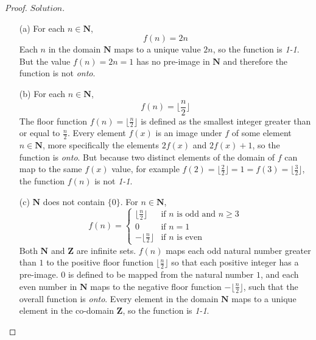\documentclass{article}
\begin{document}
\begin{proof}
$Solution.$
\begin{enumerate}
    \item[(a)] For each $n \in \mathbf{N}$,
    \begin{equation*}
        f(n) = 2n
    \end{equation*}
    Each $n$ in the domain $\mathbf{N}$ maps to a unique value $2n$, so the function is {\it 1-1}. But the value $f(n) = 2n = 1$ has no pre-image in $\mathbf{N}$ and therefore the function is not {\it onto}. 
    
    \item[(b)] For each $n \in \mathbf{N}$,
    \begin{equation*}
        f(n) = \lfloor \frac{n}{2} \rfloor
    \end{equation*} 
    The floor function $f(n) = \lfloor \frac{n}{2} \rfloor$ is defined as the smallest integer greater than or equal to $\frac{n}{2}$. Every element $f(x)$ is an image under $f$ of some element $n \in \mathbf{N}$, more specifically the elements $2f(x)$ and $2f(x) + 1$, so the function is {\it onto}. But because two distinct elements of the domain of $f$ can map to the same $f(x)$ value, for example $f(2) = \lfloor \frac{2}{2} \rfloor = 1 = f(3) = \lfloor \frac{3}{2} \rfloor$, the function $f(n)$ is not {\it 1-1}.

    \item[(c)] $\mathbf{N}$ does not contain $\{0\}$. For $n \in \mathbf{N}$,
    \begin{equation*}
        f(n) = 
        \begin{cases}
        \lfloor \frac{n}{2} \rfloor & \text{if $n$ is odd and $n \geq 3$}\\
        0 & \text{if } n = 1 \\
        -\lfloor \frac{n}{2} \rfloor & \text{if $n$ is even}
        \end{cases}
    \end{equation*}
    Both $\mathbf{N}$ and $\mathbf{Z}$ are infinite sets. $f(n)$ maps each odd natural number greater than $1$ to the positive floor function $\lfloor \frac{n}{2} \rfloor$ so that each positive integer has a pre-image. $0$ is defined to be mapped from the natural number $1$, and each even number in $\mathbf{N}$ maps to the negative floor function $-\lfloor \frac{n}{2} \rfloor$, such that the overall function is {\it onto}. Every element in the domain $\mathbf{N}$ maps to a unique element in the co-domain $\mathbf{Z}$, so the function is {\it 1-1}.
    
\end{enumerate}
\end{proof}
\end{document}
